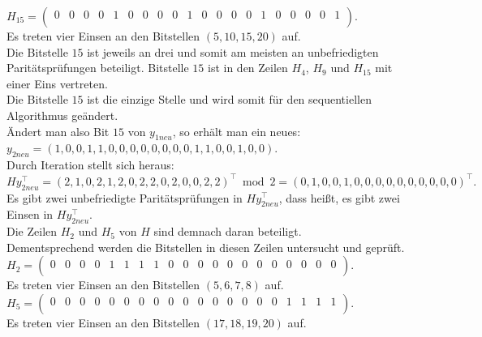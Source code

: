 \begin{Beispiel}
    $H_{15}=\left( \begin{array}{rrrrrrrrrrrrrrrrrrrr}
        0 & 0 & 0 & 0 & 1 & 0 & 0 & 0 & 0 & 1 & 0 & 0 & 0 & 0 & 1 & 0 & 0 & 0 & 0 & 1 \\
       \end{array}\right). 
    $\\
    Es treten vier Einsen an den Bitstellen $(5, 10, 15, 20)$ auf.\\
    
    Die Bitstelle $15$ ist jeweils an drei und somit am meisten an unbefriedigten Paritätsprüfungen beteiligt. 
    Bitstelle $15$ ist in den Zeilen $H_4$, $H_9$ und $H_{15}$ mit einer Eins vertreten.\\
    Die Bitstelle $15$ ist die einzige Stelle und wird somit für den sequentiellen Algorithmus geändert.\\
    
    Ändert man also Bit $15$ von $y_{1neu}$, so erhält man ein neues:\\
    $y_{2neu}= (1,0,0,1,1,0,0,0,0,0,0,0,0,1,1,0,0,1,0,0).$\\
    
    Durch Iteration stellt sich heraus:\\
    $Hy_{2neu}^\intercal= (2,1,0,2,1,2,0,2,2,0,2,0,0,2,2)^\intercal \bmod 2= (0,1,0,0,1,0,0,0,0,0,0,0,0,0,0)^\intercal.$\\
    
    Es gibt zwei unbefriedigte Paritätsprüfungen in $Hy_{2neu}^\intercal$,
    dass hei\ss{}t, es gibt zwei Einsen in $Hy_{2neu}^\intercal.$\\
    Die Zeilen $H_2$ und $H_{5}$ von $H$ sind demnach daran beteiligt.\\ 
    Dementsprechend werden die Bitstellen in diesen Zeilen untersucht und geprüft.\\
    
    $H_2= \left( \begin{array}{rrrrrrrrrrrrrrrrrrrr}
        0 & 0 & 0 & 0 & 1 & 1 & 1 & 1 & 0 & 0 & 0 & 0 & 0 & 0 & 0 & 0 & 0 & 0 & 0 & 0 \\
       \end{array}\right). 
    $\\
    Es treten vier Einsen an den Bitstellen $(5, 6, 7, 8)$ auf.\\
    
    $H_5= \left( \begin{array}{rrrrrrrrrrrrrrrrrrrr}
        0 & 0 & 0 & 0 & 0 & 0 & 0 & 0 & 0 & 0 & 0 & 0 & 0 & 0 & 0 & 0 & 1 & 1 & 1 & 1 \\
       \end{array}\right). 
    $\\
    Es treten vier Einsen an den Bitstellen $(17, 18, 19, 20)$ auf.\\
    

\end{Beispiel}
